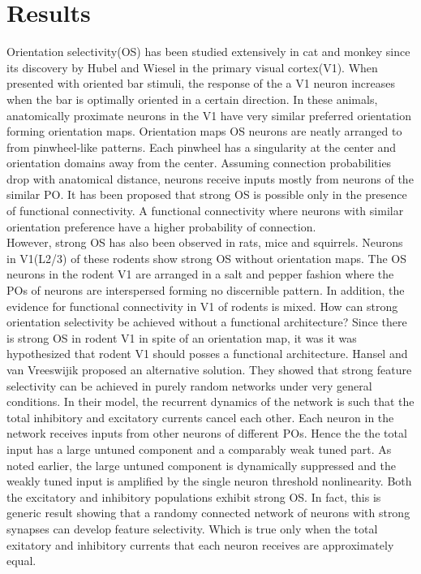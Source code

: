 \section{Results}
Orientation selectivity(OS) has been studied extensively in cat and monkey since its discovery by Hubel and Wiesel in the primary visual cortex(V1). When presented with oriented bar stimuli, the response of the a V1 neuron increases when the bar is optimally oriented in a certain direction. In these animals, anatomically proximate neurons in the V1 have very similar preferred orientation forming orientation maps. Orientation maps  OS neurons are neatly arranged to from pinwheel-like patterns. Each pinwheel has a singularity at the center and orientation domains away from the center. Assuming connection probabilities drop with anatomical distance, neurons receive inputs mostly from neurons of the similar PO. It has been proposed that strong OS is possible only in the presence of functional connectivity. A functional connectivity where neurons with similar orientation preference have a higher probability of connection.\\
However, strong OS has also been observed in rats, mice and squirrels. Neurons in V1(L2/3) of these rodents show strong OS without orientation maps. The OS neurons in the rodent V1 are arranged in a salt and pepper fashion where the POs of neurons are interspersed forming no discernible pattern. In addition, the evidence for functional connectivity in V1 of rodents is mixed. How can strong orientation selectivity be achieved without a functional architecture? Since there is strong OS in rodent V1 in spite of an orientation map, it was it was hypothesized that rodent V1 should posses a functional architecture. Hansel and van Vreeswijik proposed an alternative solution. They showed that strong feature selectivity can be achieved in purely random networks under very general conditions. In their model, the recurrent dynamics of the network is such that the total inhibitory and excitatory currents cancel each other. Each neuron in the network receives inputs from other neurons of different POs. Hence the the total input has a large untuned component and a comparably weak tuned part. As noted earlier, the large untuned component is dynamically suppressed and the weakly tuned input is amplified by the single neuron threshold nonlinearity. Both the excitatory and inhibitory populations exhibit strong OS. In fact, this is generic result showing that a randomy connected network of neurons with strong synapses can develop feature selectivity. Which is true only when the total exitatory and inhibitory currents that each neuron receives are approximately equal. \\ 
